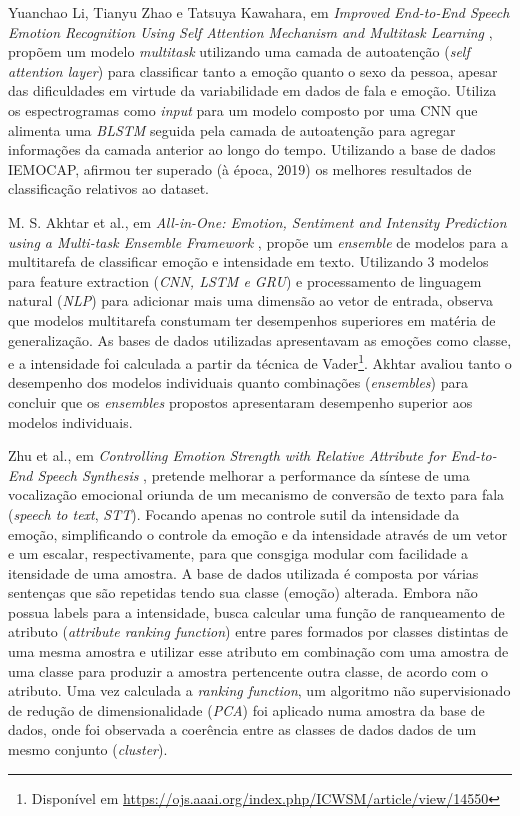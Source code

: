 Yuanchao Li, Tianyu Zhao e Tatsuya Kawahara, em \textit{Improved End-to-End Speech Emotion Recognition Using Self Attention Mechanism and Multitask Learning} \cite{32.95}, propõem um modelo \textit{multitask} utilizando uma camada de autoatenção (\textit{self attention layer}) para classificar tanto a emoção quanto o sexo da pessoa, apesar das dificuldades em virtude da variabilidade em dados de fala e emoção. Utiliza os espectrogramas como \textit{input} para um modelo composto por uma CNN\textit{ }que alimenta uma \textit{BLSTM} seguida pela camada de autoatenção para agregar informações da camada anterior ao longo do tempo. Utilizando a base de dados IEMOCAP, afirmou ter superado (à época, 2019) os melhores resultados de classificação relativos ao dataset.

M. S. Akhtar et al., em \textit{All-in-One: Emotion, Sentiment and Intensity Prediction using a Multi-task Ensemble Framework} \cite{28}, propõe um \textit{ensemble} de modelos para a multitarefa de classificar emoção e intensidade em texto. Utilizando 3 modelos para feature extraction (\textit{\textit{CNN, \textit{LSTM} e GRU}}) e processamento de linguagem natural (\textit{NLP}) para adicionar mais uma dimensão ao vetor de entrada, observa que modelos multitarefa constumam ter desempenhos superiores em matéria de generalização. As bases de dados utilizadas apresentavam as emoções como classe, e a intensidade foi calculada a partir da técnica de Vader\footnote{Disponível em \url{https://ojs.aaai.org/index.php/ICWSM/article/view/14550}}. Akhtar avaliou tanto o desempenho dos modelos individuais quanto combinações (\textit{ensembles}) para concluir que os \textit{ensembles} propostos apresentaram desempenho superior aos modelos individuais.

Zhu et al., em \textit{Controlling Emotion Strength with Relative Attribute for End-to-End Speech Synthesis} \cite{63}, pretende melhorar a performance da síntese de uma vocalização emocional oriunda de um mecanismo de conversão de texto para fala (\textit{speech to text}, \textit{STT}). Focando apenas no controle sutil da intensidade da emoção, simplificando o controle da emoção e da intensidade através de um vetor e um escalar, respectivamente, para que consgiga modular com facilidade a itensidade de uma amostra. A base de dados utilizada é composta por várias sentenças que são repetidas tendo sua classe (emoção) alterada. Embora não possua labels para a intensidade, \cite{63} busca calcular uma função de ranqueamento de atributo (\textit{attribute ranking function}) entre pares formados por classes distintas de uma mesma amostra e utilizar esse atributo em combinação com uma amostra de uma classe para produzir a amostra pertencente outra classe, de acordo com o atributo. Uma vez calculada a \textit{ranking function}, um algoritmo não supervisionado de redução de dimensionalidade (\textit{PCA}) foi aplicado numa amostra da base de dados, onde foi observada a coerência entre as classes de dados dados de um mesmo conjunto (\textit{cluster}).

